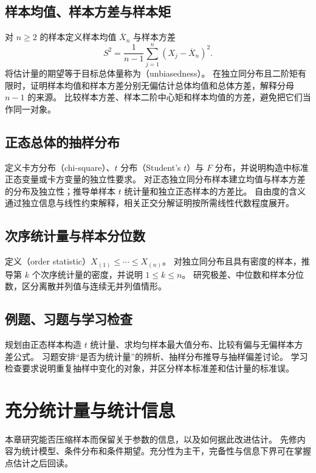 \documentclass[UTF8,12pt,a4paper,fontset=fandol]{ctexbook}
\begin{document}
\section{样本均值、样本方差与样本矩}
\label{sec:ps-sample-moments}
对 $n\geq2$ 的样本定义样本均值 $\overline X_n$ 与样本方差
\begin{equation}
  S^2=\frac{1}{n-1}\sum_{j=1}^n(X_j-\overline X_n)^2.
  \label{eq:ps-sample-variance}
\end{equation}
将估计量的期望等于目标总体量称为（unbiasedness）。
在独立同分布且二阶矩有限时，证明样本均值和样本方差分别无偏估计总体均值和总体方差，解释分母 $n-1$ 的来源。
比较样本方差、样本二阶中心矩和样本均值的方差，避免把它们当作同一对象。

\section{正态总体的抽样分布}
\label{sec:ps-normal-sampling}
定义卡方分布（chi-square）、$t$ 分布（Student's $t$）与 $F$ 分布，并说明构造中标准正态变量或卡方变量的独立性要求。
对正态独立同分布样本建立均值与样本方差的分布及独立性；推导单样本 $t$ 统计量和独立正态样本的方差比。
自由度的含义通过独立信息与线性约束解释，相关正交分解证明按所需线性代数程度展开。

\section{次序统计量与样本分位数}
\label{sec:ps-order-statistics}
定义（order statistic）$X_{(1)}\leq\cdots\leq X_{(n)}$。
对独立同分布且具有密度的样本，推导第 $k$ 个次序统计量的密度，并说明 $1\leq k\leq n$。
研究极差、中位数和样本分位数，区分离散并列值与连续无并列值情形。

\section{例题、习题与学习检查}
规划由正态样本构造 $t$ 统计量、求均匀样本最大值分布、比较有偏与无偏样本方差公式。
习题安排“是否为统计量”的辨析、抽样分布推导与抽样偏差讨论。
学习检查要求说明重复抽样中变化的对象，并区分样本标准差和估计量的标准误。


\chapter{充分统计量与统计信息}
\label{chap:ps-information}

本章研究能否压缩样本而保留关于参数的信息，以及如何据此改进估计。
先修内容为统计模型、条件分布和条件期望。充分性为主干，完备性与信息下界可在掌握点估计之后回读。
\end{document}
